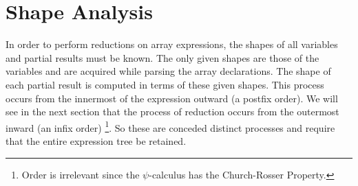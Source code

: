 \section*{Shape Analysis}
 
In order to perform reductions on array expressions,  the shapes of all 
variables and partial results must be known.  The only 
given shapes are those of the variables and are acquired while parsing the 
array declarations.  The shape of each partial result is computed in terms
of these given shapes.  This process occurs from the innermost of the expression
outward (a postfix order).  We will see in the next section that the process 
of reduction occurs from the outermost inward (an infix order)
\footnote{Order is irrelevant since the $\psi$-calculus has the Church-Rosser
Property.}.  
So these
are conceded distinct processes and require that the entire expression tree
be retained.
 
